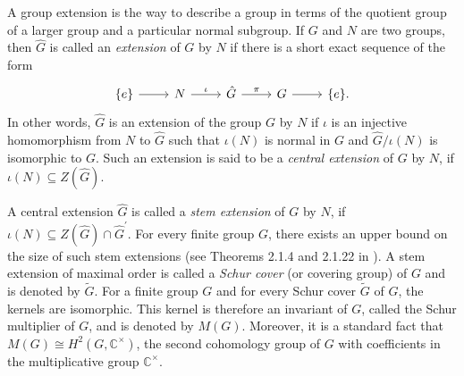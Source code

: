 \documentclass[12pt,a4paper]{article}
\begin{document}
A group extension is the way to describe a group in terms of the quotient group of a larger group and a particular normal subgroup. If $G$ and $N$ are two groups, then $\hat{G}$ is called an \textit{extension} of $G$ by $N$ if there is a short exact sequence of the form
\[
\begin{tikzcd}
  \{e\} \arrow[r] & N \arrow[r, "\iota"] & \hat{G} \arrow[r, "\pi"] & G \arrow[r] & \{e\}. 
\end{tikzcd}
\]
In other words, $\hat{G}$ is an extension of the group $G$ by $N$ if $\iota$ is an injective homomorphism from $N$ to $\hat{G}$ such that $\iota(N)$ is normal in $G$ and $\hat{G}/\iota(N)$ is isomorphic to $G$. Such an extension is said to be a \textit{central extension} of $G$ by $N$, if $\iota(N)\subseteq Z(\hat{G})$.

A central extension $\hat{G}$ is called a \textit{stem extension} of $G$ by $N$, if $\iota(N)\subseteq Z(\hat{G})\cap \hat{G}^{'}$. For every finite group $G$, there exists an upper bound on the size of such stem extensions (see Theorems 2.1.4 and 2.1.22 in \cite{karpi}). A stem extension of maximal order is called a \textit{Schur cover} (or covering group) of $G$ and is denoted by $\tilde{G}$. For a finite group $G$ and for every Schur cover $\tilde{G}$ of $G$, the kernels are isomorphic. This kernel is therefore an invariant of $G$, called the Schur multiplier of $G$, and is denoted by $M(G)$. Moreover, it is a standard fact that $M(G)\cong H^2(G,\mathbb{C}^{\times})$, the second cohomology group of $G$ with coefficients in the multiplicative group $\mathbb{C}^{\times}$.







\end{document}
